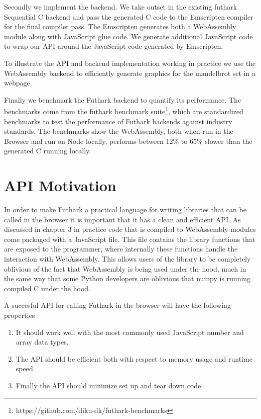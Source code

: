 \documentclass[11pt]{book}
\begin{document}
Secondly we implement the backend. We take outset in the existing futhark Sequential C backend and pass the generated C code to the Emscripten compiler for the final compiler pass. The Emscripten generates both a WebAssembly module along with JavaScript glue code. We generate additional JavaScript code to wrap our API around the JavaScript code generated by Emscripten.

To illustrate the API and backend implementation working in practice we use the WebAssembly backend to efficiently generate graphics for the mandelbrot set in a webpage.

Finally we benchmark the Futhark backend to quantify its performance. The benchmarks come from the futhark benchmark suite\footnote{https://github.com/diku-dk/futhark-benchmarks}, which are standardized benchmarks to test the performance of Futhark backends against industry standards. The benchmarks show the WebAssembly, both when run in the Browser and run on Node locally, performs between 12\% to 65\% slower than the generated C running locally. 

\section{API Motivation}

In order to make Futhark a practical language for writing libraries that can be called in the browser it is important that it has a clean and efficient API. As discussed in chapter 3 in practice code that is compiled to WebAssembly modules come packaged with a JavaScript file. This file contains the library functions that are exposed to the programmer, where internally these functions handle the interaction with WebAssembly. This allows users of the library to be completely oblivious of the fact that WebAssembly is being used under the hood, much in the same way that some Python developers are oblivious that numpy is running compiled C under the hood.

A succesful API for calling Futhark in the browser will have the following properties
\begin{enumerate}
    \item It should work well with the most commonly used JavaScript number and array data types.
    \item The API should be efficient both with respect to memory usage and runtime speed.
    \item Finally the API should minimize set up and tear down code.
\end{enumerate}
\end{document}
